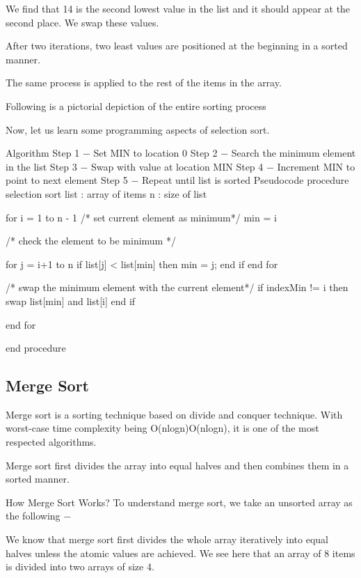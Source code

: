 We find that 14 is the second lowest value in the list and it should appear at the second place. We swap these values.



After two iterations, two least values are positioned at the beginning in a sorted manner.



The same process is applied to the rest of the items in the array.

Following is a pictorial depiction of the entire sorting process



Now, let us learn some programming aspects of selection sort.

Algorithm
Step 1 − Set MIN to location 0
Step 2 − Search the minimum element in the list
Step 3 − Swap with value at location MIN
Step 4 − Increment MIN to point to next element
Step 5 − Repeat until list is sorted
Pseudocode
procedure selection sort
   list  : array of items
   n     : size of list

   for i = 1 to n - 1
   /* set current element as minimum*/
      min = i

      /* check the element to be minimum */

      for j = i+1 to n
         if list[j] < list[min] then
            min = j;
         end if
      end for

      /* swap the minimum element with the current element*/
      if indexMin != i  then
         swap list[min] and list[i]
      end if

   end for

end procedure

\subsection{Merge Sort}

Merge sort is a sorting technique based on divide and conquer technique. With worst-case time complexity being O(nlogn)Ο(nlogn), it is one of the most respected algorithms.

Merge sort first divides the array into equal halves and then combines them in a sorted manner.

How Merge Sort Works?
To understand merge sort, we take an unsorted array as the following −



We know that merge sort first divides the whole array iteratively into equal halves unless the atomic values are achieved. We see here that an array of 8 items is divided into two arrays of size 4.



